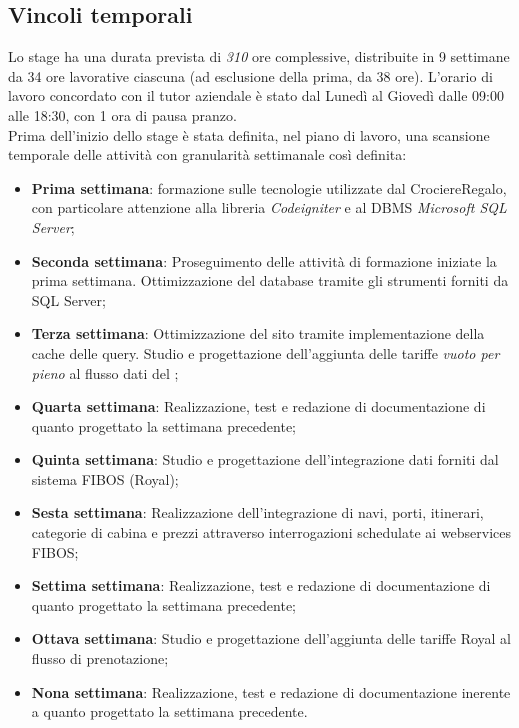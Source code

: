 \subsection{Vincoli temporali}
\label{sec:vincoli-temporali}
Lo stage ha una durata prevista di \textit{310} ore complessive, distribuite in 9 settimane da 34 ore lavorative ciascuna (ad esclusione della prima, da 38 ore). L'orario di lavoro concordato con il tutor aziendale è stato dal Lunedì al Giovedì dalle 09:00 alle 18:30, con 1 ora di pausa pranzo. \\
Prima dell'inizio dello stage è stata definita, nel piano di lavoro, una scansione temporale delle attività con granularità settimanale così definita:
\begin{itemize}
	\item \textbf{Prima settimana}: formazione sulle tecnologie utilizzate dal \bookingEngine\hphantom{i}CrociereRegalo, con particolare attenzione alla libreria \textit{Codeigniter} e al \gls{DBMS} \textit{Microsoft SQL Server};
	\item \textbf{Seconda settimana}: Proseguimento delle attività di formazione iniziate la prima settimana. Ottimizzazione del database tramite gli strumenti forniti da SQL Server;
	\item \textbf{Terza settimana}: Ottimizzazione del sito tramite implementazione della cache delle query. Studio e progettazione dell'aggiunta delle tariffe \textit{vuoto per pieno} al flusso dati del \bookingEngine;
	\item \textbf{Quarta settimana}: Realizzazione, test e redazione di documentazione di quanto progettato la settimana precedente;
	\item \textbf{Quinta settimana}: Studio e progettazione dell'integrazione dati forniti dal sistema FIBOS (Royal);
	\item \textbf{Sesta settimana}: Realizzazione dell'integrazione di navi, porti, itinerari, categorie di cabina e prezzi attraverso interrogazioni schedulate ai \glspl{webservice} FIBOS;
	\item \textbf{Settima settimana}: Realizzazione, test e redazione di documentazione di quanto progettato la settimana precedente;
	\item \textbf{Ottava settimana}: Studio e progettazione dell'aggiunta delle tariffe Royal al flusso di prenotazione;
	\item \textbf{Nona settimana}: Realizzazione, test e redazione di documentazione inerente a quanto progettato la settimana precedente.
\end{itemize}

